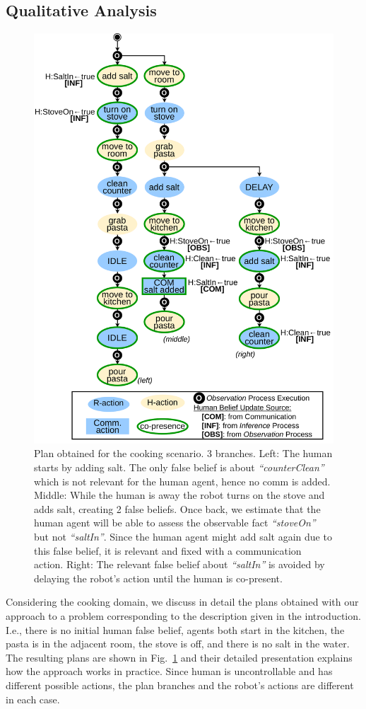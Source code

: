 \subsection{Qualitative Analysis}

\begin{figure}[t!]
    \centering
    \includegraphics[width=0.65\linewidth]{images/Chapter3/plans.pdf}
    \caption{
    Plan obtained for the cooking scenario. 3 branches. Left: The human starts by adding salt. The only false belief is about \textit{``counterClean''} which is not relevant for the human agent, hence no comm is added. Middle: While the human is away the robot turns on the stove and adds salt, creating 2 false beliefs. 
    Once back, we estimate that the human agent
    will be able to assess the observable fact \textit{``stoveOn''} but not \textit{``saltIn''}. Since the human agent might add salt again due to this false belief, it is relevant and fixed with a communication action. Right: The relevant false belief about \textit{``saltIn''} is avoided by delaying the robot's action until the human is co-present.
    }
    \label{fig:cooking_plan}
\end{figure}

Considering the cooking domain, we discuss in detail the plans obtained with our approach to a problem corresponding to the description given in the introduction. 
I.e., there is no initial human false belief, agents both start in the kitchen, the pasta is in the adjacent room, the stove is off, and there is no salt in the water. The resulting plans are shown in Fig.~\ref{fig:cooking_plan} and their detailed presentation explains how the approach works in practice. 
Since human is uncontrollable and has different possible actions, the plan branches and the robot's actions are different in each case. 

